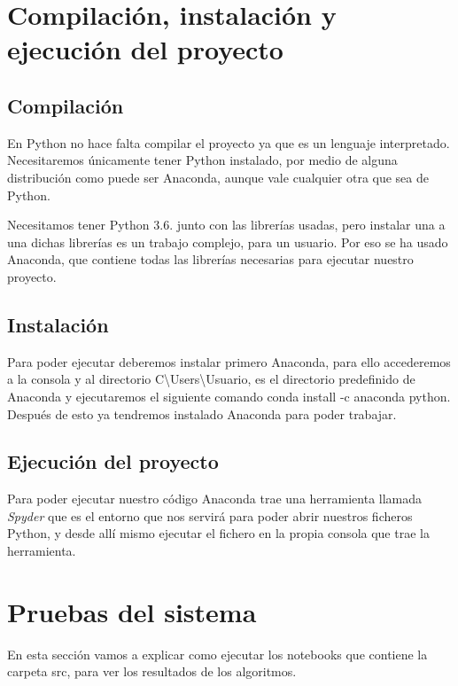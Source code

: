 \section{Compilación, instalación y ejecución del proyecto}
\subsection{Compilación}
En Python no hace falta compilar el proyecto ya que es un lenguaje interpretado. Necesitaremos únicamente tener Python instalado, por medio de alguna distribución como puede ser Anaconda, aunque vale cualquier otra que sea de Python.

Necesitamos tener Python 3.6. junto con las librerías usadas, pero instalar una a una dichas librerías es un trabajo complejo, para un usuario. Por eso se ha usado Anaconda, que contiene todas las librerías necesarias para ejecutar nuestro proyecto.

\subsection{Instalación}
Para poder ejecutar deberemos instalar primero Anaconda, para ello accederemos a la consola y al directorio \textrm{C\textbackslash Users\textbackslash Usuario}, es el directorio predefinido de Anaconda y ejecutaremos el siguiente comando \textrm{conda install -c anaconda python}. Después de esto ya tendremos instalado Anaconda para poder trabajar.

\subsection{Ejecución del proyecto}
Para poder ejecutar nuestro código Anaconda trae una herramienta llamada \textit{Spyder} que es el entorno que nos servirá para poder abrir nuestros ficheros Python, y desde allí mismo ejecutar el fichero en la propia consola que trae la herramienta.

\section{Pruebas del sistema}
En esta sección vamos a explicar como ejecutar los notebooks que contiene la carpeta src, para ver los resultados de los algoritmos. 

